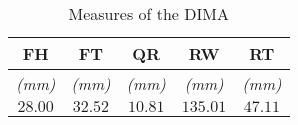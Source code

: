 \begin{table}
\centering
\begin{tabular}{|c|c|c|c|c|}
\hline
\textbf{FH}   & \textbf{FT}   & \textbf{QR}   & \textbf{RW}   & \textbf{RT}   \\ \hline
\textit{(mm)} & \textit{(mm)} & \textit{(mm)} & \textit{(mm)} & \textit{(mm)} \\ \hline
$28.00$       & $32.52$       & $10.81$       & $135.01$      & $47.11$         \\ \hline
\end{tabular}
\caption{Measures of the DIMA}
\label{tab:exp2-measures}
\end{table}